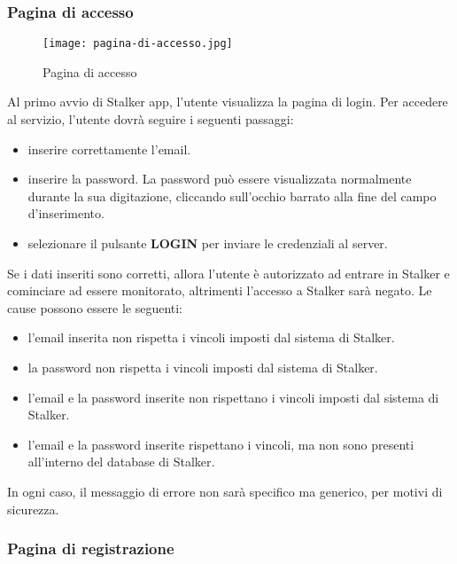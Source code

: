 \documentclass[../manuale-utente.tex]{subfiles}
\begin{document}
\subsubsection{Pagina di accesso}%
\label{sub:pagina_di_accesso}

\begin{figure}[H]
    \centering
    \texttt{[image: pagina-di-accesso.jpg]}
    \caption{Pagina di accesso}%
    \label{fig:mobile_app_pagina_di_accesso}
\end{figure}
Al primo avvio di Stalker app, l'utente visualizza la pagina di login.
Per accedere al servizio, l'utente dovrà seguire i seguenti passaggi:
\begin{itemize}
    \item inserire correttamente l'email.
    \item inserire la password. La password può essere visualizzata normalmente durante la sua digitazione, cliccando sull'occhio barrato alla fine del campo d'inserimento.
    \item selezionare il pulsante \textbf{LOGIN} per inviare le credenziali al server.
\end{itemize}
Se i dati inseriti sono corretti, allora l'utente è autorizzato ad entrare in Stalker e cominciare ad essere monitorato, altrimenti l'accesso a Stalker sarà negato.
Le cause possono essere le seguenti:
\begin{itemize}
    \item l'email inserita non rispetta i vincoli imposti dal sistema di Stalker.
    \item la password non rispetta i vincoli imposti dal sistema di Stalker.
    \item l'email e la password inserite non rispettano i vincoli imposti dal sistema di Stalker.
    \item l'email e la password inserite rispettano i vincoli, ma non sono presenti all'interno del database di Stalker.
\end{itemize}
In ogni caso, il messaggio di errore non sarà specifico ma generico, per motivi di sicurezza.

\subsubsection{Pagina di registrazione}%
\label{subs:pagina_di_registrazione}
\end{document}
